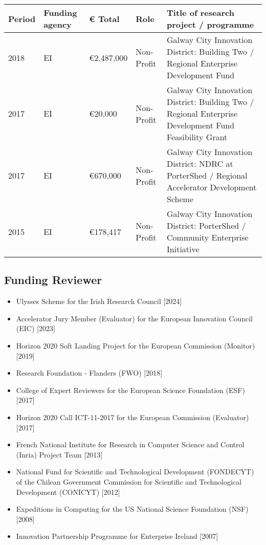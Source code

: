 \documentclass[10pt,a4paper]{res} %
\begin{document}
\begin{resume}
\begin{tabular}{ p{2 cm} | p{2 cm} | p{2 cm} | p{2 cm} | p{7 cm} }
Period & Funding agency & \euro{} Total & Role & Title of research project / programme \\
\hline
2018 & EI & \euro{}2,487,000 & Non-Profit & Galway City Innovation District: Building Two / Regional Enterprise Development Fund \\
2017 & EI & \euro{}20,000 & Non-Profit & Galway City Innovation District: Building Two / Regional Enterprise Development Fund Feasibility Grant \\
2017 & EI & \euro{}670,000 & Non-Profit & Galway City Innovation District: NDRC at PorterShed / Regional Accelerator Development Scheme \\
2015 & EI & \euro{}178,417 & Non-Profit & Galway City Innovation District: PorterShed / Community Enterprise Initiative \\
\end{tabular}

\subsection*{Funding Reviewer}

\begin{itemize} \itemsep -2pt
\item Ulysses Scheme for the Irish Research Council [2024]
\item Accelerator Jury Member (Evaluator) for the European Innovation Council (EIC) [2023]
\item Horizon 2020 Soft Landing Project for the European Commission (Monitor) [2019]
\item Research Foundation - Flanders (FWO) [2018]
\item College of Expert Reviewers for the European Science Foundation (ESF) [2017]
\item Horizon 2020 Call ICT-11-2017 for the European Commission (Evaluator) [2017]
\item French National Institute for Research in Computer Science and Control (Inria) Project Team [2013]
\item National Fund for Scientific and Technological Development (FONDECYT) of the Chilean Government Commission for Scientific and Technological Development (CONICYT) [2012]
\item Expeditions in Computing for the US National Science Foundation (NSF) [2008]
\item Innovation Partnership Programme for Enterprise Ireland [2007]
\end{itemize}


\end{resume}
\end{document}
